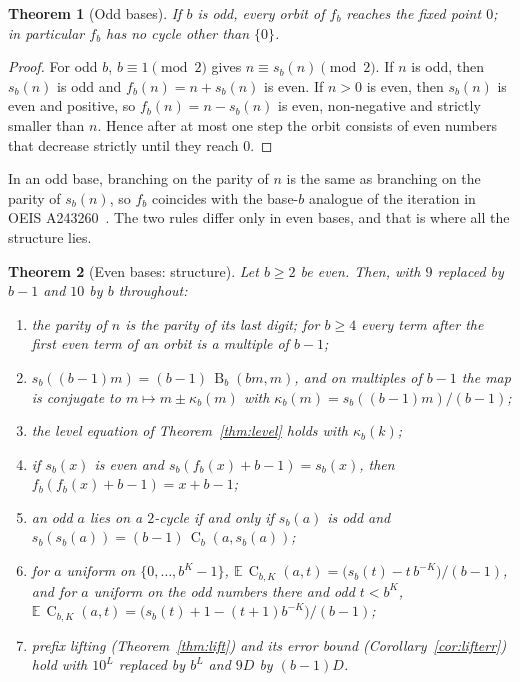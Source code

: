 \documentclass[11pt]{article}
\newtheorem{theorem}{Theorem}[section]
\theoremstyle{definition}
\theoremstyle{remark}
\newcommand{\C}{\operatorname{C}}
\newcommand{\B}{\operatorname{B}}
\begin{document}
\begin{theorem}[Odd bases]\label{thm:oddbase}
If $b$ is odd, every orbit of $f_b$ reaches the fixed point $0$; in particular
$f_b$ has no cycle other than $\{0\}$.
\end{theorem}

\begin{proof}
For odd $b$, $b\equiv1\pmod2$ gives $n\equiv s_b(n)\pmod2$. If $n$ is odd,
then $s_b(n)$ is odd and $f_b(n)=n+s_b(n)$ is even. If $n>0$ is even, then
$s_b(n)$ is even and positive, so $f_b(n)=n-s_b(n)$ is even, non-negative and
strictly smaller than $n$. Hence after at most one step the orbit consists of
even numbers that decrease strictly until they reach $0$.
\end{proof}

In an odd base, branching on the parity of $n$ is the same as branching on
the parity of $s_b(n)$, so $f_b$ coincides with the base-$b$ analogue of the
iteration in OEIS A243260~\cite{OEIS-A243260}. The two rules differ only in
even bases, and that is where all the structure lies.

\begin{theorem}[Even bases: structure]\label{thm:evenbase}
Let $b\ge2$ be even. Then, with $9$ replaced by $b-1$ and $10$ by $b$
throughout:
\begin{enumerate}
\item the parity of $n$ is the parity of its last digit; for $b\ge4$ every term
  after the first even term of an orbit is a multiple of $b-1$;
\item $s_b((b-1)m)=(b-1)\,\B_b(bm,m)$, and on multiples of $b-1$ the map is
  conjugate to $m\mapsto m\pm\kappa_b(m)$ with $\kappa_b(m)=s_b((b-1)m)/(b-1)$;
\item the level equation of Theorem~\ref{thm:level} holds with
  $\kappa_b(k)$;
\item if $s_b(x)$ is even and $s_b(f_b(x)+b-1)=s_b(x)$, then
  $f_b(f_b(x)+b-1)=x+b-1$;
\item an odd $a$ lies on a $2$-cycle if and only if $s_b(a)$ is odd and
  $s_b(s_b(a))=(b-1)\,\C_b(a,s_b(a))$;
\item for $a$ uniform on $\{0,\dots,b^K-1\}$,
  $\mathbb E\,\C_{b,K}(a,t)=\bigl(s_b(t)-t\,b^{-K}\bigr)/(b-1)$, and for $a$
  uniform on the odd numbers there and odd $t<b^K$,
  $\mathbb E\,\C_{b,K}(a,t)=\bigl(s_b(t)+1-(t+1)b^{-K}\bigr)/(b-1)$;
\item prefix lifting (Theorem~\ref{thm:lift}) and its error bound
  (Corollary~\ref{cor:lifterr}) hold with $10^L$ replaced by $b^L$ and $9D$ by
  $(b-1)D$.
\end{enumerate}
\end{theorem}
\end{document}
